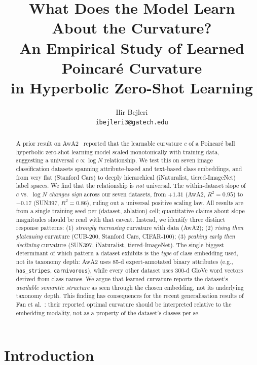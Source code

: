 \documentclass{article}
\title{What Does the Model Learn About the Curvature?\\
An Empirical Study of Learned Poincar\'{e} Curvature\\
in Hyperbolic Zero-Shot Learning}
\author{
  Ilir Bejleri \\
  \texttt{ibejleri3@gatech.edu}
}
\begin{document}
\maketitle

\begin{abstract}
A prior result on AwA2~\cite{bejleri2025bayesian} reported that the learnable curvature $c$ of a Poincar\'{e} ball hyperbolic zero-shot learning model scaled monotonically with training data, suggesting a universal $c \propto \log N$ relationship.
We test this on seven image classification datasets spanning attribute-based and text-based class embeddings, and from very flat (Stanford Cars) to deeply hierarchical (iNaturalist, tiered-ImageNet) label spaces.
We find that the relationship is \emph{not} universal.
The within-dataset slope of $c$ vs.\ $\log N$ \emph{changes sign} across our seven datasets, from $+1.31$ (AwA2, $R^2=0.95$) to $-0.17$ (SUN397, $R^2=0.86$), ruling out a universal positive scaling law.
All results are from a single training seed per (dataset, ablation) cell; quantitative claims about slope magnitudes should be read with that caveat.
Instead, we identify three distinct response patterns:
(1) \emph{strongly increasing} curvature with data (AwA2);
(2) \emph{rising then plateauing} curvature (CUB-200, Stanford Cars, CIFAR-100);
(3) \emph{peaking early then declining} curvature (SUN397, iNaturalist, tiered-ImageNet).
The single biggest determinant of which pattern a dataset exhibits is the \emph{type} of class embedding used, not its taxonomy depth: AwA2 uses 85-d expert-annotated binary attributes (e.g., \texttt{has\_stripes}, \texttt{carnivorous}), while every other dataset uses 300-d GloVe word vectors derived from class names.
We argue that learned curvature reports the dataset's \emph{available semantic structure} as seen through the chosen embedding, not its underlying taxonomy depth.
This finding has consequences for the recent generalisation results of Fan et al.~\cite{fan2025curvature}: their reported optimal curvature should be interpreted relative to the embedding modality, not as a property of the dataset's classes per se.
\end{abstract}

\section{Introduction}\label{sec:intro}
\end{document}
